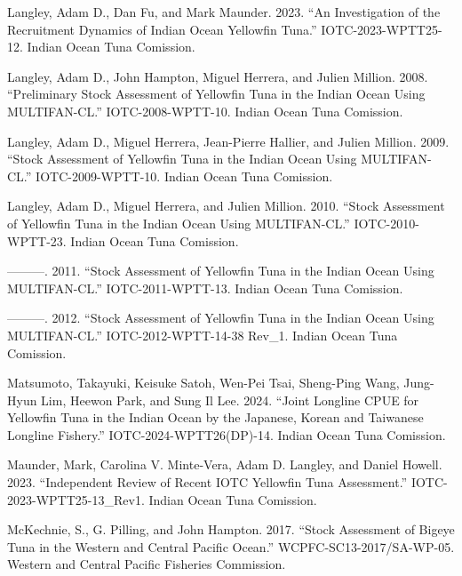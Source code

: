 \documentclass[
]{scrartcl}
\newlength{\cslhangindent}
\newenvironment{CSLReferences}[2] %
 {\begin{list}{}{%
  \setlength{\itemindent}{0pt}
  \setlength{\leftmargin}{0pt}
  \setlength{\parsep}{0pt}
  \ifodd #1
   \setlength{\leftmargin}{\cslhangindent}
   \setlength{\itemindent}{-1\cslhangindent}
  \fi
  \setlength{\itemsep}{#2\baselineskip}}}
 {\end{list}}
\begin{document}
\begin{CSLReferences}{1}{0}
Langley, Adam D., Dan Fu, and Mark Maunder. 2023. {``An Investigation of
the Recruitment Dynamics of {Indian Ocean} Yellowfin Tuna.''}
IOTC-2023-WPTT25-12. Indian Ocean Tuna Comission.

Langley, Adam D., John Hampton, Miguel Herrera, and Julien Million.
2008. {``Preliminary Stock Assessment of Yellowfin Tuna in the {Indian
Ocean} Using {MULTIFAN-CL}.''} IOTC-2008-WPTT-10. Indian Ocean Tuna
Comission.

Langley, Adam D., Miguel Herrera, Jean-Pierre Hallier, and Julien
Million. 2009. {``Stock Assessment of Yellowfin Tuna in the {Indian
Ocean} Using {MULTIFAN-CL}.''} IOTC-2009-WPTT-10. Indian Ocean Tuna
Comission.

Langley, Adam D., Miguel Herrera, and Julien Million. 2010. {``Stock
Assessment of Yellowfin Tuna in the {Indian Ocean} Using
{MULTIFAN-CL}.''} IOTC-2010-WPTT-23. Indian Ocean Tuna Comission.

---------. 2011. {``Stock Assessment of Yellowfin Tuna in the {Indian
Ocean} Using {MULTIFAN-CL}.''} IOTC-2011-WPTT-13. Indian Ocean Tuna
Comission.

---------. 2012. {``Stock Assessment of Yellowfin Tuna in the {Indian
Ocean} Using {MULTIFAN-CL}.''} IOTC-2012-WPTT-14-38 Rev\_1. Indian Ocean
Tuna Comission.

Matsumoto, Takayuki, Keisuke Satoh, Wen-Pei Tsai, Sheng-Ping Wang,
Jung-Hyun Lim, Heewon Park, and Sung Il Lee. 2024. {``Joint Longline
{CPUE} for Yellowfin Tuna in the {Indian Ocean} by the {Japanese},
{Korean} and {Taiwanese} Longline Fishery.''} IOTC-2024-WPTT26(DP)-14.
Indian Ocean Tuna Comission.

Maunder, Mark, Carolina V. Minte-Vera, Adam D. Langley, and Daniel
Howell. 2023. {``Independent Review of Recent {IOTC} Yellowfin Tuna
Assessment.''} IOTC-2023-WPTT25-13\_Rev1. Indian Ocean Tuna Comission.

McKechnie, S., G. Pilling, and John Hampton. 2017. {``Stock Assessment
of Bigeye Tuna in the Western and Central {Pacific Ocean}.''}
WCPFC-SC13-2017/SA-WP-05. {Western and Central Pacific Fisheries
Commission}.


\end{CSLReferences}
\end{document}

